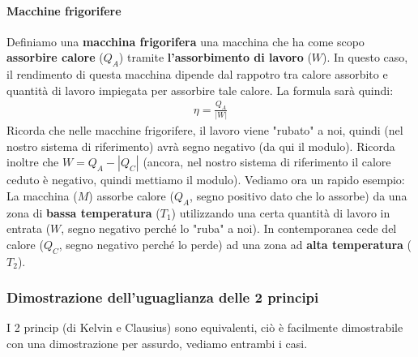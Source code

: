                 \paragraph{Macchine frigorifere}
                    Definiamo una \textbf{macchina frigorifera} una macchina che ha come scopo \textbf{assorbire calore} ($Q_A$) tramite \textbf{l'assorbimento di lavoro} ($W$). In questo caso, il rendimento di questa macchina dipende dal rappotro tra calore assorbito e quantità di lavoro impiegata per assorbire tale calore. La formula sarà quindi:
                    \begin{align*}
                        \eta = \frac{Q_A}{|W|}
                    \end{align*}
                    Ricorda che nelle macchine frigorifere, il lavoro viene "rubato" a noi, quindi (nel nostro sistema di riferimento) avrà segno negativo  (da qui il modulo). Ricorda inoltre che $W = Q_A-|Q_C|$ (ancora, nel nostro sistema di riferimento il calore ceduto è negativo, quindi mettiamo il modulo). Vediamo ora un rapido esempio:
                    La macchina ($M$) assorbe calore ($Q_A$, segno positivo dato che lo assorbe)  da una zona di \textbf{bassa temperatura} ($T_1$) utilizzando una certa quantità di lavoro in entrata ($W$, segno negativo perché lo "ruba" a noi). In contemporanea cede del calore ($Q_C$, segno negativo perché lo perde) ad una zona ad \textbf{alta temperatura} ($T_2$).

            \subsubsection{Dimostrazione dell'uguaglianza delle 2 principi}
                I 2 princip (di Kelvin e Clausius) sono equivalenti, ciò è facilmente dimostrabile con una dimostrazione per assurdo, vediamo entrambi i casi.

